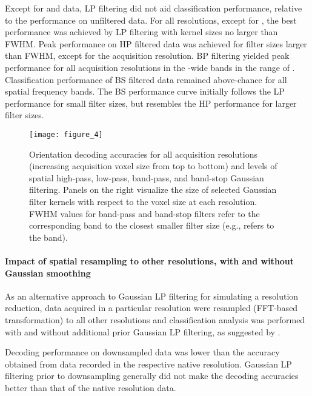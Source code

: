 Except for  and  data, LP filtering did not aid classification
performance, relative to the performance on unfiltered data. For all
resolutions, except for , the best performance was achieved by LP
filtering with kernel sizes no larger than  FWHM.
%
Peak performance on HP filtered data was achieved for filter sizes larger than
 FWHM, except for the  acquisition resolution.
%
BP filtering yielded peak performance for all acquisition resolutions in the
-wide bands in the range of \bandofinterest.
%
Classification performance of BS filtered data remained above-chance for all
spatial frequency bands. The BS performance curve initially follows the LP
performance for small filter sizes, but resembles the HP performance for larger
filter sizes.


\begin{figure}
  \centering
  \texttt{[image: figure\_4]}

  \caption{
    Orientation decoding accuracies for all acquisition resolutions (increasing
    acquisition voxel size from top to bottom) and levels of spatial high-pass,
    low-pass, band-pass, and band-stop Gaussian filtering. Panels on the right
    visualize the size of selected Gaussian filter kernels with respect to the
    voxel size at each resolution. FWHM values for band-pass and band-stop
    filters refer to the corresponding  band to the closest smaller
    filter size (e.g.,  refers to the  band).
  }
  \label{fig:spatial_smoothing}
\end{figure}



\paragraph*{Impact of spatial resampling to other resolutions, with and without
Gaussian smoothing}
%
As an alternative approach to Gaussian LP filtering for simulating a resolution
reduction, data acquired in a particular resolution were resampled (FFT-based
transformation) to all other resolutions and classification analysis was
performed with and without additional prior Gaussian LP filtering, as suggested
by \cite{freeman_2013}.

Decoding performance on downsampled data was lower than the accuracy obtained from data
recorded in the respective native resolution. Gaussian LP filtering prior to
downsampling generally did not make the decoding accuracies better than 
that of the native resolution data.

